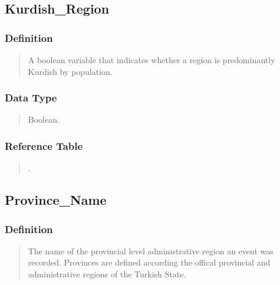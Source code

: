 \documentclass[letterpaper,10pt,english]{sphinxmanual}
\begin{document}
\subsection{Kurdish\_Region}
\label{\detokenize{database_schema:kurdish-region}}

\subsubsection{Definition}
\label{\detokenize{database_schema:id28}}\begin{quote}

\sphinxAtStartPar
A boolean variable that indicates whether a region is predominantly Kurdish by population.
\end{quote}


\subsubsection{Data Type}
\label{\detokenize{database_schema:id29}}\begin{quote}

\sphinxAtStartPar
Boolean.
\end{quote}


\subsubsection{Reference Table}
\label{\detokenize{database_schema:id30}}\begin{quote}

\sphinxAtStartPar
{\hyperref[\detokenize{database_schema:overview-table}]{}}.
\end{quote}


\subsection{Province\_Name}
\label{\detokenize{database_schema:province-name}}

\subsubsection{Definition}
\label{\detokenize{database_schema:id31}}\begin{quote}

\sphinxAtStartPar
The name of the provincial level administrative region an event was recorded.  Provinces are defined according the offical provincial and administrative regions of the Turkish State.
\end{quote}
\end{document}
